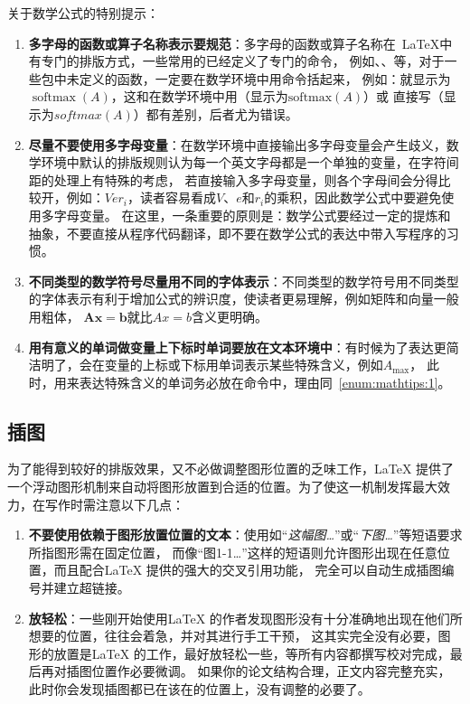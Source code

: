 关于数学公式的特别提示：
\begin{enumerate}
  \item \textbf{多字母的函数或算子名称表示要规范}：多字母的函数或算子名称在~\LaTeX{}中有专门的排版方式，一些常用的已经定义了专门的命令，
        例如、、等，对于一些包中未定义的函数，一定要在数学环境中用命令括起来，
        例如：就显示为$\operatorname{softmax}(A)$，这和在数学环境中用（显示为$\text{softmax}(A)$）或
        直接写（显示为$softmax(A)$）都有差别，后者尤为错误。
  \item \textbf{尽量不要使用多字母变量}：在数学环境中直接输出多字母变量会产生歧义，数学环境中默认的排版规则认为每一个英文字母都是一个单独的变量，在字符间距的处理上有特殊的考虑，
        若直接输入多字母变量，则各个字母间会分得比较开，例如：$Ver_i$，读者容易看成$V$、$e$和$r_i$的乘积，因此数学公式中要避免使用多字母变量。
        在这里，一条重要的原则是：数学公式要经过一定的提炼和抽象，不要直接从程序代码翻译，即不要在数学公式的表达中带入写程序的习惯。\label{enum:mathtips:1}
  \item \textbf{不同类型的数学符号尽量用不同的字体表示}：不同类型的数学符号用不同类型的字体表示有利于增加公式的辨识度，使读者更易理解，例如矩阵和向量一般用粗体，
        $\mathbf{Ax}=\mathbf{b}$就比$Ax=b$含义更明确。
  \item \textbf{用有意义的单词做变量上下标时单词要放在文本环境中}：有时候为了表达更简洁明了，会在变量的上标或下标用单词表示某些特殊含义，例如$A_\text{max}$，
        此时，用来表达特殊含义的单词务必放在命令中，理由同~\ref{enum:mathtips:1}。
\end{enumerate}

\subsection{插图}
为了能得到较好的排版效果，又不必做调整图形位置的乏味工作，\LaTeX{} 提供了一个浮动图形机制来自动将图形放置到合适的位置。为了使这一机制发挥最大效力，在写作时需注意以下几点：
\begin{enumerate}
	\item \textbf{不要使用依赖于图形放置位置的文本}：使用如“\emph{这幅图…}”或“\emph{下图…}”等短语要求所指图形需在固定位置，
	      而像“{\kaishu 图1-1…}”这样的短语则允许图形出现在任意位置，而且配合\LaTeX{} 提供的强大的交叉引用功能，
	      完全可以自动生成插图编号并建立超链接。
	\item \textbf{放轻松}：一些刚开始使用\LaTeX{} 的作者发现图形没有十分准确地出现在他们所想要的位置，往往会着急，并对其进行手工干预，
	      这其实完全没有必要，图形的放置是\LaTeX{} 的工作，最好放轻松一些，等所有内容都撰写校对完成，最后再对插图位置作必要微调。
	      如果你的论文结构合理，正文内容完整充实，此时你会发现插图都已在该在的位置上，没有调整的必要了。
\end{enumerate}

